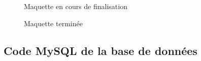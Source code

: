 \begin{figure}[H]
    \begin{center}
        \caption{Maquette en cours de finalisation}
    \end{center}
\end{figure}

\begin{figure}[H]
    \begin{center}
        \caption{Maquette terminée}
    \end{center}
\end{figure}

\subsection{Code MySQL de la base de données}
